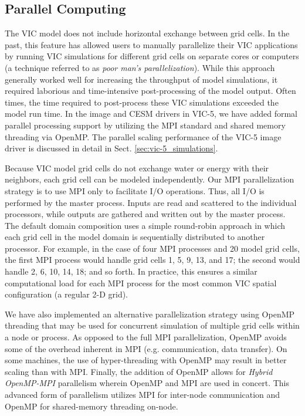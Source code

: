 \documentclass[gmd, manuscript]{copernicus}
\begin{document}
  \subsection{Parallel Computing}
    \label{sec:parallel}
    The VIC model does not include horizontal exchange between grid cells. In the past, this feature has allowed users to manually parallelize their VIC applications by running VIC simulations for different grid cells on separate cores or computers (a technique referred to as \textit{poor man's parallelization}). While this approach generally worked well for increasing the throughput of model simulations, it required laborious and time-intensive post-processing of the model output. Often times, the time required to post-process these VIC simulations exceeded the model run time. In the image and CESM drivers in VIC-5, we have added formal parallel processing support by utilizing the MPI standard and shared memory threading via OpenMP. The parallel scaling performance of the VIC-5 image driver is discussed in detail in Sect. \ref{sec:vic-5_simulations}.

    Because VIC model grid cells do not exchange water or energy with their neighbors, each grid cell can be modeled independently. Our MPI parallelization strategy is to use MPI only to facilitate I/O operations. Thus, all I/O is performed by the master process. Inputs are read and scattered to the individual processors, while outputs are gathered and written out by the master process. The default domain composition uses a simple round-robin approach in which each grid cell in the model domain is sequentially distributed to another processor. For example, in the case of four MPI processes and 20 model grid cells, the first MPI process would handle grid cells 1, 5, 9, 13, and 17; the second would handle 2, 6, 10, 14, 18; and so forth. In practice, this ensures a similar computational load for each MPI process for the most common VIC spatial configuration (a regular 2-D grid).

    We have also implemented an alternative parallelization strategy using OpenMP threading that may be used for concurrent simulation of multiple grid cells within a node or process. As opposed to the full MPI parallelization, OpenMP avoids some of the overhead inherent in MPI (e.g. communication, data transfer). On some machines, the use of hyper-threading with OpenMP may result in better scaling than with MPI. Finally, the addition of OpenMP allows for \textit{Hybrid OpenMP-MPI} parallelism wherein OpenMP and MPI are used in concert. This advanced form of parallelism utilizes MPI for inter-node communication and OpenMP for shared-memory threading on-node.
\end{document}

